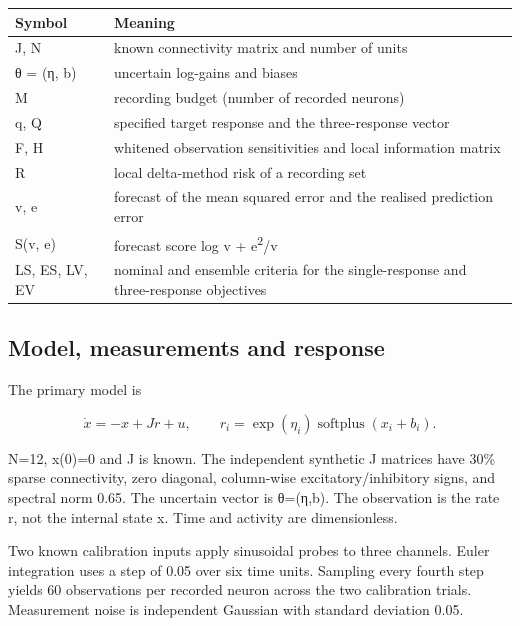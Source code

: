 \begin{center}

\centering\small
\begin{tabular*}{\textwidth}{@{\extracolsep{\fill}}ll}
\toprule
Symbol & Meaning \\
\midrule
J, N & known connectivity matrix and number of units \\
θ = (η, b) & uncertain log-gains and biases \\
M & recording budget (number of recorded neurons) \\
q, Q & specified target response and the three-response vector \\
F, H & whitened observation sensitivities and local information matrix \\
R & local delta-method risk of a recording set \\
v, e & forecast of the mean squared error and the realised prediction error \\
S(v, e) & forecast score log v + e\textsuperscript{2}/v \\
LS, ES, LV, EV & nominal and ensemble criteria for the single-response and three-response objectives \\
\bottomrule
\end{tabular*}
\end{center}

\subsection{Model, measurements and response}

The primary model is

\begin{equation}
\dot x=-x+Jr+u,\qquad
r_i=\exp(\eta_i)\operatorname{softplus}(x_i+b_i).
\end{equation}

N=12, x(0)=0 and J is known. The independent synthetic J matrices have 30\% sparse connectivity, zero diagonal, column-wise excitatory/inhibitory signs, and spectral norm 0.65. The uncertain vector is θ=(η,b). The observation is the rate r, not the internal state x. Time and activity are dimensionless.

Two known calibration inputs apply sinusoidal probes to three channels. Euler integration uses a step of 0.05 over six time units. Sampling every fourth step yields 60 observations per recorded neuron across the two calibration trials. Measurement noise is independent Gaussian with standard deviation 0.05.

